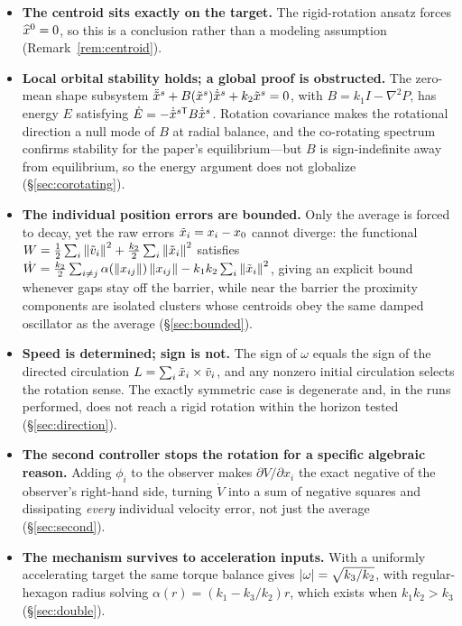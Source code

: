 \begin{itemize}[leftmargin=1.6em,itemsep=0.35em]
  \item \textbf{The centroid sits exactly on the target.} The rigid-rotation ansatz forces
        $\widehat{x}^0=0$, so this is a conclusion rather than a modeling assumption
        (Remark~\ref{rem:centroid}).

  \item \textbf{Local orbital stability holds; a global proof is obstructed.} The zero-mean shape
        subsystem $\ddot{\tilde{x}}^s+B(\tilde{x}^s)\dot{\tilde{x}}^s+k_2\tilde{x}^s=0$, with $B=k_1I-\nabla^2P$, has energy
        $E$ satisfying $\dot E=-\dot{\tilde{x}}^{s\mathsf T}B\dot{\tilde{x}}^s$. Rotation covariance makes the
        rotational direction a null mode of $B$ at radial balance, and the co-rotating spectrum confirms
        stability for the paper's equilibrium---but $B$ is sign-indefinite away from equilibrium, so the
        energy argument does not globalize (\S\ref{sec:corotating}).

  \item \textbf{The individual position errors are bounded.} Only the average is forced to decay, yet
        the raw errors $\tilde{x}_i=x_i-x_0$ cannot diverge: the functional
        $W=\frac12\sum_i\left\| \tilde{v}_i \right\|^2+\frac{k_2}{2}\sum_i\left\| \tilde{x}_i \right\|^2$ satisfies
        $\dot W=\frac{k_2}{2}\sum_{i\ne j}\alpha(\left\| x_{ij} \right\|)\left\| x_{ij} \right\|-k_1k_2\sum_i\left\| \tilde{x}_i \right\|^2$,
        giving an explicit bound whenever gaps stay off the barrier, while near the barrier the
        proximity components are isolated clusters whose centroids obey the same damped oscillator as
        the average (\S\ref{sec:bounded}).

  \item \textbf{Speed is determined; sign is not.} The sign of $\omega$ equals the sign of the directed
        circulation $L=\sum_i\tilde{x}_i\times\tilde{v}_i$, and any nonzero initial circulation selects the
        rotation sense. The exactly symmetric case is degenerate and, in the runs performed, does not
        reach a rigid rotation within the horizon tested (\S\ref{sec:direction}).

  \item \textbf{The second controller stops the rotation for a specific algebraic reason.} Adding
        $\phi_i$ to the observer makes $\partial V/\partial x_i$ the exact negative of the observer's
        right-hand side, turning $\dot V$ into a sum of negative squares and dissipating \emph{every}
        individual velocity error, not just the average (\S\ref{sec:second}).

  \item \textbf{The mechanism survives to acceleration inputs.} With a uniformly accelerating target the
        same torque balance gives $\left| \omega \right|=\sqrt{k_3/k_2}$, with regular-hexagon radius solving
        $\alpha(r)=(k_1-k_3/k_2)r$, which exists when $k_1k_2>k_3$ (\S\ref{sec:double}).


\end{itemize}
